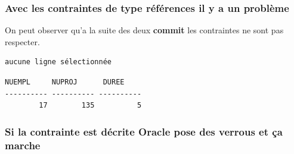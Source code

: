 \documentclass{article}
\begin{document}
\subsubsection{Avec les contraintes de type références il y a un problème}
On peut observer qu'a la suite des deux \textbf{commit} les contraintes ne sont pas respecter.
\begin{lstlisting}[caption= select * from employe where nuempl=17;]
aucune ligne sélectionnée
\end{lstlisting}

\begin{lstlisting}[caption= select * from travail where nuempl=17;]
    NUEMPL     NUPROJ      DUREE
---------- ---------- ----------
        17        135          5 
\end{lstlisting}

\subsubsection{Si la contrainte est décrite Oracle pose des verrous et ça marche}
\end{document}
